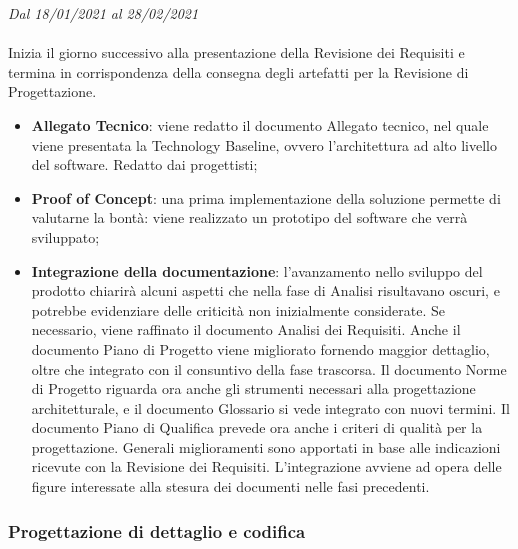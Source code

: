 \textit{Dal 18/01/2021 al 28/02/2021}
\\\\
Inizia il giorno successivo alla presentazione della Revisione dei Requisiti e termina in corrispondenza della consegna degli artefatti per la Revisione di Progettazione.
\begin{itemize}
	\item \textbf{Allegato Tecnico}: viene redatto il documento Allegato tecnico, nel quale viene presentata la Technology Baseline, ovvero l'architettura ad alto livello del software. Redatto dai progettisti;
	\item \textbf{Proof of Concept}: una prima implementazione della soluzione permette di valutarne la bontà: viene realizzato un prototipo del software che verrà sviluppato;
	\item \textbf{Integrazione della documentazione}: l'avanzamento nello sviluppo del prodotto chiarirà alcuni aspetti che nella fase di Analisi risultavano oscuri, e potrebbe evidenziare delle criticità non inizialmente considerate. Se necessario, viene raffinato il documento Analisi dei Requisiti. Anche il documento Piano di Progetto viene migliorato fornendo maggior dettaglio, oltre che integrato con il consuntivo della fase trascorsa. Il documento Norme di Progetto riguarda ora anche gli strumenti necessari alla progettazione architetturale, e il documento Glossario si vede integrato con nuovi termini. Il documento Piano di Qualifica prevede ora anche i criteri di qualità per la progettazione. Generali miglioramenti sono apportati in base alle indicazioni ricevute con la Revisione dei Requisiti. L'integrazione avviene ad opera delle figure interessate alla stesura dei documenti nelle fasi precedenti.
\end{itemize}



\subsubsection{Progettazione di dettaglio e codifica}

